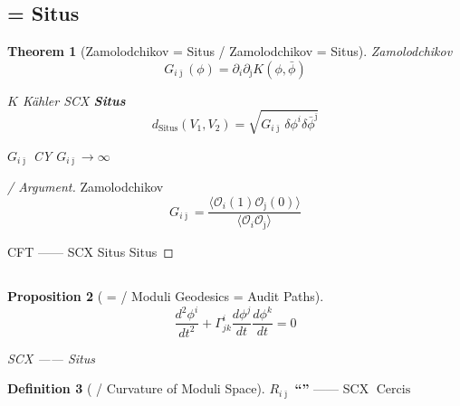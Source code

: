 \documentclass[12pt,a4paper]{article}
\theoremstyle{plain}
\newtheorem{theorem}{ Theorem}[section]
\newtheorem{proposition}[theorem]{ Proposition}
\theoremstyle{definition}
\newtheorem{definition}[theorem]{ Definition}
\newcommand{\Ocal}{\mathcal{O}}
\DeclareMathOperator{\Cercis}{Cercis}
\DeclareMathOperator{\Situs}{Situs}
\begin{document}
\subsection{ = Situs }

\begin{theorem}[Zamolodchikov  = Situs  / Zamolodchikov = Situs]
 Zamolodchikov 
\begin{equation}
    G_{i\bar{\jmath}}(\phi) = \partial_i \partial_{\bar{\jmath}} K(\phi, \bar{\phi})
\end{equation}

 $K$  Kähler \textbf{} SCX  \textbf{Situs }
\begin{equation}
    d_{\Situs}(V_1, V_2) = \sqrt{G_{i\bar{\jmath}} \,\delta\phi^i \delta\bar{\phi}^{\bar{\jmath}}}
\end{equation}

\textbf{}
$G_{i\bar{\jmath}}$  CY 
$G_{i\bar{\jmath}} \to \infty$ 
\end{theorem}

\begin{proof}[ / Argument]
Zamolodchikov 
\begin{equation}
    G_{i\bar{\jmath}} = \frac{\langle \Ocal_i(1) \Ocal_{\bar{\jmath}}(0) \rangle}
    {\langle \Ocal_i \Ocal_{\bar{\jmath}} \rangle_{\text{}}}
\end{equation}

 CFT \textbf{}—— SCX  Situs 
 Situs 
\end{proof}


\subsection{}

\begin{proposition}[ =  / Moduli Geodesics = Audit Paths]

\begin{equation}
    \frac{d^2\phi^i}{dt^2} + \Gamma^i_{jk} \frac{d\phi^j}{dt}\frac{d\phi^k}{dt} = 0
\end{equation}

 SCX \textbf{}——
 Situs 
\end{proposition}

\begin{definition}[ / Curvature of Moduli Space]
 $R_{i\bar{\jmath}}$ \textbf{``''}
——
 SCX \textbf{ $\Cercis$ }
\end{definition}
\end{document}
